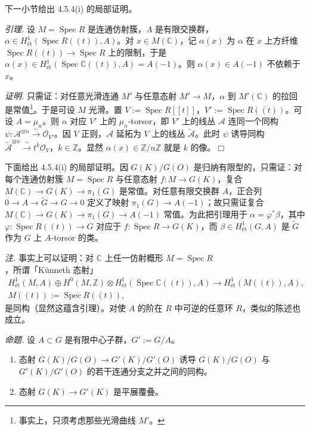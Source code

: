下一小节给出 4.5.4(i) 的局部证明。

 \emph{引理.} 设 $M=\operatorname{Spec} R$ 是连通仿射簇，$A$ 是有限交换群，$\alpha\in H^1_{\text{ét}}(\operatorname{Spec} R((t)),A)$。对 $x\in M(\mathbb{C})$，记 $\alpha(x)$ 为 $\alpha$ 在 $x$ 上方纤维 $\operatorname{Spec} R((t))\to\operatorname{Spec} R$ 上的限制，于是 $\alpha(x)\in H^1_{\text{ét}}(\operatorname{Spec}\mathbb{C}((t)),A)=A(-1)$。则 $\alpha(x)\in A(-1)$ 不依赖于 $x$。

\emph{证明.} 只需证：对任意光滑连通 $M'$ 与任意态射 $M'\to M$，$\alpha$ 到 $M'(\mathbb{C})$ 的拉回是常值\footnote{事实上，只须考虑那些光滑曲线 $M'$。}。于是可设 $M$ 光滑。置 $V:=\operatorname{Spec} R[[t]]$，$V':=\operatorname{Spec} R((t))$。可设 $A=\mu_n$。则 $\alpha$ 对应 $V'$ 上的 $\mu_n$-torsor，即 $V'$ 上的线丛 $\mathcal{A}$ 连同一个同构 $\psi:\mathcal{A}^{\otimes n}\xrightarrow{\ \sim\ }\mathcal{O}_{V'}$。因 $V$ 正则，$\mathcal{A}$ 延拓为 $V$ 上的线丛 $\tilde{\mathcal{A}}$。此时 $\psi$ 诱导同构 $\tilde{\mathcal{A}}^{\otimes n}\xrightarrow{\ \sim\ }t^k\mathcal{O}_V$，$k\in\mathbb{Z}$。显然 $\alpha(x)\in\mathbb{Z}/n\mathbb{Z}$ 就是 $k$ 的像。\hfill$\Box$

下面给出 4.5.4(i) 的局部证明。因 $G(K)/G(O)$ 是归纳有限型的，只需证：对每个连通仿射簇 $M=\operatorname{Spec} R$ 与任意态射 $f:M\to G(K)$，复合 $M(\mathbb{C})\to G(K)\to\pi_1(G)$ 是常值。对任意有限交换群 $A$，正合列 $0\to A\to\tilde{G}\to G\to 0$ 定义了映射 $\pi_1(G)\to A(-1)$；故只需证复合 $M(\mathbb{C})\to G(K)\to\pi_1(G)\to A(-1)$ 常值。为此把引理用于 $\alpha=\varphi^*\beta$，其中 $\varphi:\operatorname{Spec} R((t))\to G$ 对应于 $f:\operatorname{Spec} R\to G(K)$，而 $\beta\in H^1_{\text{ét}}(G,A)$ 是 $\tilde{G}$ 作为 $G$ 上 $A$-torsor 的类。

\emph{注.} 事实上可以证明：对 $\mathbb{C}$ 上任一仿射概形 $M=\operatorname{Spec} R$，所谓「Künneth 态射」
\begin{equation}\tag{228}
\begin{gathered}
H^1_{\text{ét}}(M,A)\oplus H^0(M,\mathbb{Z})\otimes H^1_{\text{ét}}(\operatorname{Spec}\mathbb{C}((t)),A)\to H^1_{\text{ét}}(M((t)),A),\\
M((t)):=\operatorname{Spec} R((t)),
\end{gathered}
\end{equation}
是同构（显然这蕴含引理）。对使 $A$ 的阶在 $R$ 中可逆的任意环 $R$，类似的陈述也成立。

 \emph{命题.} 设 $A\subset G$ 是有限中心子群，$G':=G/A$。
\begin{enumerate}[label=(\roman*),leftmargin=2.2em]
\item 态射 $G(K)/G(O)\to G'(K)/G'(O)$ 诱导 $G(K)/G(O)$ 与 $G'(K)/G'(O)$ 的若干连通分支之并之间的同构。
\item 态射 $G(K)\to G'(K)$ 是平展覆叠。
\end{enumerate}

